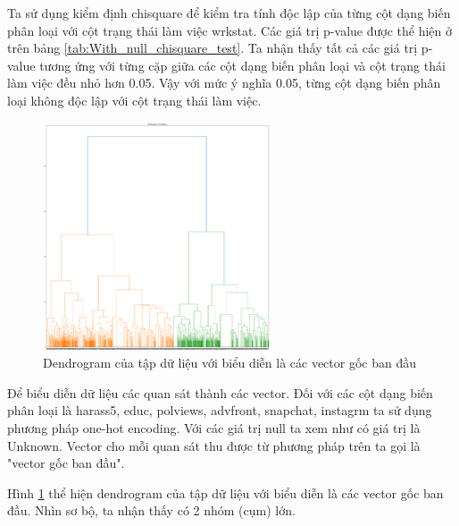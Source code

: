 Ta sử dụng kiểm định chisquare để kiểm tra tính độc lập của từng cột dạng biến phân loại với cột trạng thái làm việc wrkstat.
Các giá trị p-value được thể hiện ở trên bảng \ref{tab:With_null_chisquare_test}.
Ta nhận thấy tất cả các giá trị p-value tương ứng với từng cặp giữa các cột dạng biến phân loại và cột trạng thái làm việc đều nhỏ hơn 0.05.
Vậy với mức ý nghĩa 0.05, từng cột dạng biến phân loại không độc lập với cột trạng thái làm việc.

\begin{figure}[H]
    \centering
    \includegraphics[width=0.6\textwidth]{figures/Thanh/Data_Analysis/With_null_dendrogram_original_features.png}
    \caption{Dendrogram của tập dữ liệu với biểu diễn là các vector gốc ban đầu}
    \label{fig:With_null_dendrogram_original_features}
\end{figure}

Để biểu diễn dữ liệu các quan sát thành các vector.
Đối với các cột dạng biến phân loại là harass5, educ, polviews, advfront, snapchat, instagrm ta sử dụng phương pháp one-hot encoding.
Với các giá trị null ta xem như có giá trị là Unknown.
Vector cho mỗi quan sát thu được từ phương pháp trên ta gọi là "vector gốc ban đầu".

Hình \ref{fig:With_null_dendrogram_original_features} thể hiện dendrogram của tập dữ liệu với biểu diễn là các vector gốc ban đầu.
Nhìn sơ bộ, ta nhận thấy có 2 nhóm (cụm) lớn.


